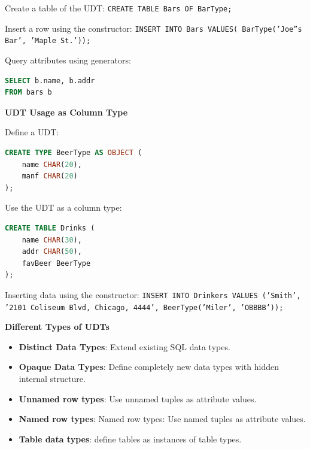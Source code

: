 \documentclass[11pt]{article}
\newcommand{\boldsec}[1]{
    \vspace{11pt}
    \textbf{#1}
    \vspace{11pt}
}
\newcommand{\boldsecbottom}[1]{
    \textbf{#1}
    \vspace{11pt}
}
\begin{document}
Create a table of the UDT: \texttt{CREATE TABLE Bars OF BarType;}

Insert a row using the constructor: \texttt{INSERT INTO Bars VALUES( BarType('Joe''s Bar', 'Maple St.'));}

Query attributes using generators: 

\vspace{11pt}
\begin{lstlisting}[language=sql, breaklines=true, showstringspaces=false]
SELECT b.name, b.addr
FROM bars b
\end{lstlisting}
\vspace{11pt}

\boldsecbottom{UDT Usage as Column Type}

Define a UDT:
\vspace{11pt}
\begin{lstlisting}[language=sql, breaklines=true, showstringspaces=false]
CREATE TYPE BeerType AS OBJECT (
    name CHAR(20),
    manf CHAR(20)
);
\end{lstlisting}
\vspace{11pt}

Use the UDT as a column type:
\vspace{11pt}
\begin{lstlisting}[language=sql, breaklines=true, showstringspaces=false]
CREATE TABLE Drinks (
    name CHAR(30),
    addr CHAR(50),
    favBeer BeerType
);
\end{lstlisting}
\vspace{11pt}

Inserting data using the constructor: \texttt{INSERT INTO Drinkers VALUES ('Smith', '2101 Coliseum Blvd, Chicago, 4444', BeerType('Miler', 'OBBBB'));}

\boldsec{Different Types of UDTs}

\begin{itemize}
    \item \textbf{Distinct Data Types}: Extend existing SQL data types.
    \item \textbf{Opaque Data Types}: Define completely new data types with hidden internal structure.
    \item \textbf{Unnamed row types}: Use unnamed tuples as attribute values.
    \item \textbf{Named row types}: Named row types: Use named tuples as attribute values.
    \item \textbf{Table data types}: define tables as instances of table types.
\end{itemize}
\vspace{11pt}
\end{document}
